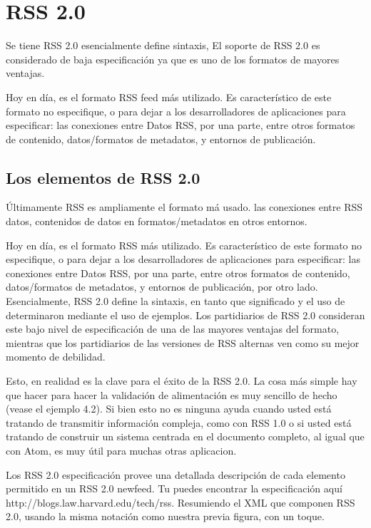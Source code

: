 \section{RSS 2.0}

Se tiene RSS 2.0 esencialmente define sintaxis, El soporte de RSS 2.0 es considerado de baja especificaci\'{o}n
ya que es uno de los formatos de mayores ventajas.

Hoy en d\'{i}a, es el formato RSS feed m\'{a}s utilizado. Es caracter\'{i}stico de este formato no especifique,
o para dejar a los desarrolladores de aplicaciones para especificar: las conexiones entre Datos RSS, por una 
parte, entre otros formatos de contenido, datos/formatos de metadatos, y entornos de publicaci\'{o}n.\cite{wittenbrink2005rss}

\subsection{Los elementos de RSS 2.0}

\'{U}ltimamente RSS es ampliamente el formato m\'{a} usado. las conexiones entre RSS datos, contenidos de datos
en formatos/metadatos en otros entornos.

Hoy en d\'{i}a, es el formato RSS m\'{a}s utilizado. Es caracter\'{i}stico de este formato no especifique,
o para dejar a los desarrolladores de aplicaciones para especificar: las conexiones entre Datos RSS, por una
parte, entre otros formatos de contenido, datos/formatos de metadatos, y entornos de publicaci\'{o}n, por otro
lado. Esencialmente, RSS 2.0 define la sintaxis, en tanto que significado y el uso de determinaron mediante el
uso de ejemplos. Los partidiarios de RSS 2.0 consideran este bajo nivel de especificaci\'{o}n de una de las
mayores ventajas del formato, mientras que los partidiarios de las versiones de RSS alternas ven como su mejor
momento de debilidad.\cite{wittenbrink2005rss}

Esto, en realidad es la clave para el \'{e}xito de la RSS 2.0. La cosa m\'{a}s simple hay que hacer para hacer la validaci\'{o}n
de alimentaci\'{o}n es muy sencillo de hecho (vease el ejemplo 4.2). Si bien esto no es ninguna ayuda cuando usted est\'{a}
tratando de transmitir informaci\'{o}n compleja, como con RSS 1.0 o si usted est\'{a} tratando de construir un sistema centrada
en el documento completo, al igual que con Atom, es muy \'{u}til para muchas otras aplicacion.\cite{hammersley2005developing}

Los RSS 2.0 especificación provee una detallada descripci\'{o}n de cada elemento permitido en un RSS 2.0
newfeed. Tu puedes encontrar la especificaci\'{o}n aqu\'{i}  http://blogs.law.harvard.edu/tech/rss. Resumiendo
el XML que componen RSS 2.0, usando la misma notaci\'{o}n como nuestra previa figura, con un toque.\cite{johnson2006rss}

